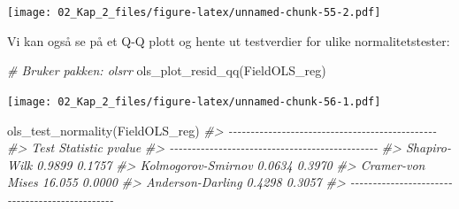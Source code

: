 \documentclass[
]{article}
\newenvironment{Shaded}{\begin{snugshade}}{\end{snugshade}}
\newcommand{\AttributeTok}[1]{\textcolor[rgb]{0.77,0.63,0.00}{#1}}
\newcommand{\CommentTok}[1]{\textcolor[rgb]{0.56,0.35,0.01}{\textit{#1}}}
\newcommand{\DecValTok}[1]{\textcolor[rgb]{0.00,0.00,0.81}{#1}}
\newcommand{\FunctionTok}[1]{\textcolor[rgb]{0.00,0.00,0.00}{#1}}
\newcommand{\NormalTok}[1]{#1}
\newcommand{\OtherTok}[1]{\textcolor[rgb]{0.56,0.35,0.01}{#1}}
\newcommand{\SpecialCharTok}[1]{\textcolor[rgb]{0.00,0.00,0.00}{#1}}
\newcommand{\StringTok}[1]{\textcolor[rgb]{0.31,0.60,0.02}{#1}}
\begin{document}
\begin{Shaded}
\end{Shaded}

\texttt{[image: 02\_Kap\_2\_files/figure-latex/unnamed-chunk-55-2.pdf]}

Vi kan også se på et Q-Q plott og hente ut testverdier for ulike normalitetstester:

\begin{Shaded}
\begin{Highlighting}[]
\CommentTok{\# Bruker pakken: olsrr}
\FunctionTok{ols\_plot\_resid\_qq}\NormalTok{(FieldOLS\_reg)}
\end{Highlighting}
\end{Shaded}

\texttt{[image: 02\_Kap\_2\_files/figure-latex/unnamed-chunk-56-1.pdf]}

\begin{Shaded}
\begin{Highlighting}[]
\FunctionTok{ols\_test\_normality}\NormalTok{(FieldOLS\_reg)}
\CommentTok{\#\textgreater{} {-}{-}{-}{-}{-}{-}{-}{-}{-}{-}{-}{-}{-}{-}{-}{-}{-}{-}{-}{-}{-}{-}{-}{-}{-}{-}{-}{-}{-}{-}{-}{-}{-}{-}{-}{-}{-}{-}{-}{-}{-}{-}{-}{-}{-}{-}{-}}
\CommentTok{\#\textgreater{}        Test             Statistic       pvalue  }
\CommentTok{\#\textgreater{} {-}{-}{-}{-}{-}{-}{-}{-}{-}{-}{-}{-}{-}{-}{-}{-}{-}{-}{-}{-}{-}{-}{-}{-}{-}{-}{-}{-}{-}{-}{-}{-}{-}{-}{-}{-}{-}{-}{-}{-}{-}{-}{-}{-}{-}{-}{-}}
\CommentTok{\#\textgreater{} Shapiro{-}Wilk              0.9899         0.1757 }
\CommentTok{\#\textgreater{} Kolmogorov{-}Smirnov        0.0634         0.3970 }
\CommentTok{\#\textgreater{} Cramer{-}von Mises          16.055         0.0000 }
\CommentTok{\#\textgreater{} Anderson{-}Darling          0.4298         0.3057 }
\CommentTok{\#\textgreater{} {-}{-}{-}{-}{-}{-}{-}{-}{-}{-}{-}{-}{-}{-}{-}{-}{-}{-}{-}{-}{-}{-}{-}{-}{-}{-}{-}{-}{-}{-}{-}{-}{-}{-}{-}{-}{-}{-}{-}{-}{-}{-}{-}{-}{-}{-}{-}}
\end{Highlighting}
\end{Shaded}
\end{document}
